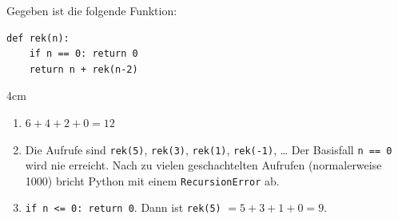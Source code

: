 \question[3]
Gegeben ist die folgende Funktion:
\begin{lstlisting}
def rek(n):
    if n == 0: return 0
    return n + rek(n-2)
\end{lstlisting}
\begin{solutionbox}{4cm}
\begin{enumerate}[label=\alph*)]
\item $6 + 4 + 2 + 0 = 12$
\item Die Aufrufe sind \texttt{rek(5)}, \texttt{rek(3)}, \texttt{rek(1)}, \texttt{rek(-1)}, \ldots{} Der Basisfall
\texttt{n == 0} wird nie erreicht. Nach zu vielen geschachtelten Aufrufen (normalerweise 1000) bricht Python mit einem \texttt{RecursionError} ab.
\item \texttt{if n <= 0: return 0}. Dann ist \texttt{rek(5)} $= 5 + 3 + 1 + 0 = 9$.
\end{enumerate}
\end{solutionbox}
